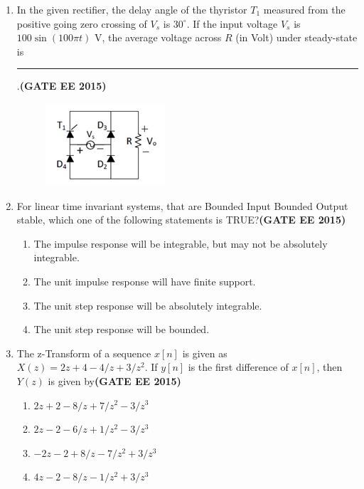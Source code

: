 \documentclass[a4paper,12pt]{exam}
\theoremstyle{remark}
\begin{document}
\begin{enumerate}
\item In the given rectifier, the delay angle of the thyristor $T_1$ measured from the positive going zero crossing of $V_s$ is $30^\circ$. If the input voltage $V_s$ is $100\sin(100\pi t)$ V, the average voltage across $R$ (in Volt) under steady-state is \rule{2cm}{0.15mm}.\hfill{\textbf{(GATE EE 2015)}}
\begin{figure}[H]
    \centering
    \includegraphics[width=0.5\columnwidth]{figs/2Q 43.png}
    \caption{}
    \label{fig:placeholder}
\end{figure}

\item For linear time invariant systems, that are Bounded Input Bounded Output stable, which one of the following statements is TRUE?\hfill{\textbf{(GATE EE 2015)}}
    \begin{enumerate}
        \item The impulse response will be integrable, but may not be absolutely integrable.
        \item The unit impulse response will have finite support.
        \item The unit step response will be absolutely integrable.
        \item The unit step response will be bounded.
    \end{enumerate}

\item The z-Transform of a sequence $x[n]$ is given as $X(z) = 2z + 4 - 4/z + 3/z^2$. If $y[n]$ is the first difference of $x[n]$, then $Y(z)$ is given by\hfill{\textbf{(GATE EE 2015)}}
    \begin{enumerate}
        \item $2z + 2 - 8/z + 7/z^2 - 3/z^3$
        \item $2z - 2 - 6/z + 1/z^2 - 3/z^3$
        \item $-2z - 2 + 8/z - 7/z^2 + 3/z^3$
        \item $4z - 2 - 8/z - 1/z^2 + 3/z^3$
    \end{enumerate}


\end{enumerate}
\end{document}
